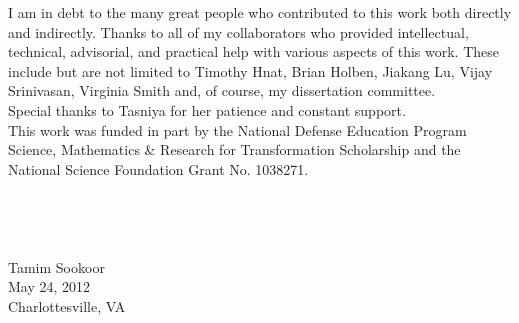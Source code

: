 \begin{acknowledgements}
I am in debt to the many great people who contributed to this work both directly
and indirectly. Thanks to all of my collaborators who provided intellectual,
technical, advisorial, and practical help with various aspects of this work.
These include but are not limited to Timothy Hnat, Brian Holben, Jiakang Lu,
Vijay Srinivasan, Virginia Smith and, of course, my
dissertation committee.  \\

\noindent Special thanks to Tasniya for her patience and constant support. \\

\noindent This work was funded in part by the National Defense Education Program
Science, Mathematics \& Research for Transformation Scholarship and the National
Science Foundation Grant No. 1038271. \\
\\
\\
\\
\\
\noindent Tamim Sookoor\\
May 24, 2012\\
Charlottesville, VA
\end{acknowledgements}
